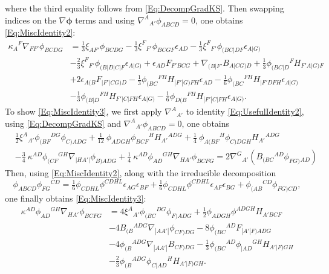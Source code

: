 \documentclass[10pt,a4paper]{article}
\theoremstyle{plain}
\begin{document}
where the third equality follows from \eqref{Eq:DecompGradKS}. Then swapping indices on the $\nabla\bm\phi$ terms and using $\nabla^A{}_{A'}\phi_{ABCD}=0$, one obtains \eqref{Eq:MiscIdentity2}:
\begin{align*}
    \kappa_{A}{}^{F} \nabla_{FF'}\phi_{BCDG} &= \tfrac{1}{3} \xi_{AF'}
    \phi_{BCDG} - \tfrac{1}{3} \xi^{F}{}_{F'} \phi_{BCGF}
    \epsilon_{AD} - \tfrac{1}{3}
    \xi^{F}{}_{F'}\phi_{(BC|DF}\epsilon_{A|G)} \nonumber \\ & -
    \tfrac{2}{3} \xi^{F}{}_{F'}\phi_{(B|D|C|F}\epsilon_{A|G)} +
    \epsilon_{AD} F_{F'BCG} + \nabla_{(B|F'}B_{A|CG)D} + \tfrac{1}{3}
    \phi_{(BC|D}{}^{F}H_{F'A|G)F} \nonumber \\& + 2
    \epsilon_{A(B}F_{|F'\vert CG)D} - \tfrac{1}{3}
    \phi_{(BC}{}^{FH}H_{|F'|G)FH}\epsilon_{AD} - \tfrac{1}{6}
    \phi_{(BC}{}^{FH}H_{|F'DFH}\epsilon_{A|G)} \nonumber\\ & -
    \tfrac{1}{3} \phi_{(B|D}{}^{FH}H_{F'|C|FH}\epsilon_{A|G)} -
    \tfrac{1}{6}
    \phi_{D(B}{}^{FH}H_{|F'|C|FH}\epsilon_{A|G)}.
\end{align*}
To show \eqref{Eq:MiscIdentity3}, we first apply $\nabla^A{}_{A'}$ to identity \eqref{Eq:UsefulIdentity2}, using \eqref{Eq:DecompGradKS} and $\nabla^A{}_{A'}\phi_{ABCD}=0$, one obtains
\begin{align*}
&\tfrac{1}{2} \xi^{A}{}_{A'} \phi_{(BF}{}^{DG} \phi_{C)ADG} + \tfrac{1}{12} \
\phi_{ADGH} \phi_{BCF}{}^{H} H_{A'}{}^{ADG} + \tfrac{1}{4} \
\phi_{A(BF}{}^{H} \phi_{C)DGH} H_{A'}{}^{ADG}  \\
&-  \tfrac{3}{4} \
\kappa^{AD} \phi_{(CF}{}^{GH} \nabla_{\vert HA'\vert}\phi_{B)ADG} + \tfrac{1}{4} \
\kappa^{AD} \phi_{AD}{}^{GH} \nabla_{HA'}\phi_{BCFG} = 2 \nabla^G{}_{A'}(B_{(BC}{}^{AD} \phi_{FG)}{}_{AD})	
\end{align*}
Then, using \eqref{Eq:MiscIdentity2}, along with the irreducible decomposition 
\begin{equation*}
\phi_{ABCD} \phi_{FG}{}^{CD} = \tfrac{1}{6} \phi_{CDHL} \phi^{CDHL}
\epsilon_{AG} \epsilon_{BF} + \tfrac{1}{6} \phi_{CDHL} \phi^{CDHL}
\epsilon_{AF} \epsilon_{BG} +
\phi_{(AB}{}^{CD}\phi_{FG)CD}, %
\end{equation*}
one finally obtains \eqref{Eq:MiscIdentity3}: 
\begin{align*}
    \kappa^{AD} \phi_{AD}{}^{GH} \nabla_{HA'}\phi_{BCFG} &= 4
    \xi^{A}{}_{A'}\phi_{(BC}{}^{DG}\phi_{F)ADG} + \tfrac{1}{2}
    \phi_{ADGH} \phi^{ADGH} H_{A'BCF} \nonumber\\ & - 4
    B_{(B}{}^{ADG}\nabla_{|AA'|}\phi_{CF)DG} - 8
    \phi_{(BC}{}^{AD}F_{|A'|F)ADG}\nonumber \\ & - 4
    \phi_{(B}{}^{ADG}\nabla_{|AA'|}B_{CF)DG} - \tfrac{1}{3}
    \phi_{(BC}{}^{AD}\phi_{|AD}{}^{GH}H_{A'|F)GH}\nonumber \\ & -
    \tfrac{2}{3}
    \phi_{(B}{}^{ADG}\phi_{C|AD}{}^{H}H_{A'|F)GH}. \label{Eq:MiscIdentity3}
\end{align*}
\end{document}
